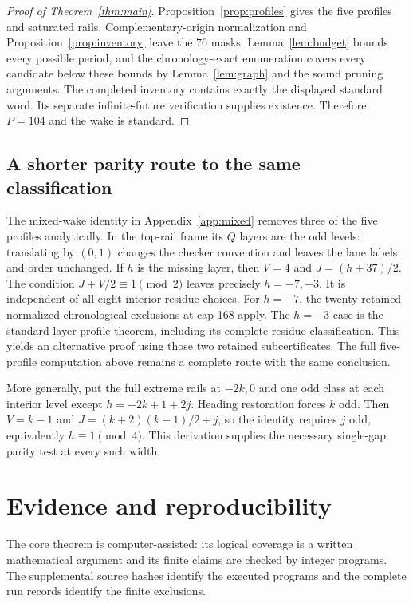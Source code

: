 \documentclass[11pt]{article}
\theoremstyle{definition}\newtheorem{definition}[theorem]{Definition}
\begin{document}
\begin{proof}[Proof of Theorem~\ref{thm:main}]
Proposition~\ref{prop:profiles} gives the five profiles and saturated rails.
Complementary-origin normalization and Proposition~\ref{prop:inventory} leave
the $76$ masks. Lemma~\ref{lem:budget} bounds every possible period, and the
chronology-exact enumeration covers every candidate below these bounds by
Lemma~\ref{lem:graph} and the sound pruning arguments. The completed inventory
contains exactly the displayed standard word. Its separate infinite-future
verification supplies existence. Therefore $P=104$ and the wake is standard.
\end{proof}


\subsection{A shorter parity route to the same classification}\label{sec:parity-route}\label{sec:parity-splice}
The mixed-wake identity in Appendix~\ref{app:mixed} removes three of the five
profiles analytically. In the top-rail frame its $Q$ layers are the odd
levels: translating by $(0,1)$ changes the checker convention and leaves
the lane labels and order unchanged. If $h$ is the missing layer, then
$V=4$ and $J=(h+37)/2$. The condition $J+V/2\equiv1\pmod2$ leaves precisely
$h=-7,-3$. It is independent of all eight interior residue choices.
For $h=-7$, the twenty retained normalized chronological exclusions at cap
168 apply. The $h=-3$ case is the standard layer-profile theorem, including
its complete residue classification. This yields an alternative proof using
those two retained subcertificates. The full five-profile computation above
remains a complete route with the same conclusion.

More generally, put the full extreme rails at $-2k,0$ and one odd class at
each interior level except $h=-2k+1+2j$. Heading restoration forces $k$ odd.
Then $V=k-1$ and $J=(k+2)(k-1)/2+j$, so the identity requires $j$ odd,
equivalently $h\equiv1\pmod4$. This derivation supplies the necessary
single-gap parity test at every such width.




\section{Evidence and reproducibility}\label{sec:verification}
The core theorem is computer-assisted: its logical coverage is a written
mathematical argument and its finite claims are checked by integer programs.
The supplemental source hashes identify the executed programs and the
complete run records identify the finite exclusions.
\end{document}
